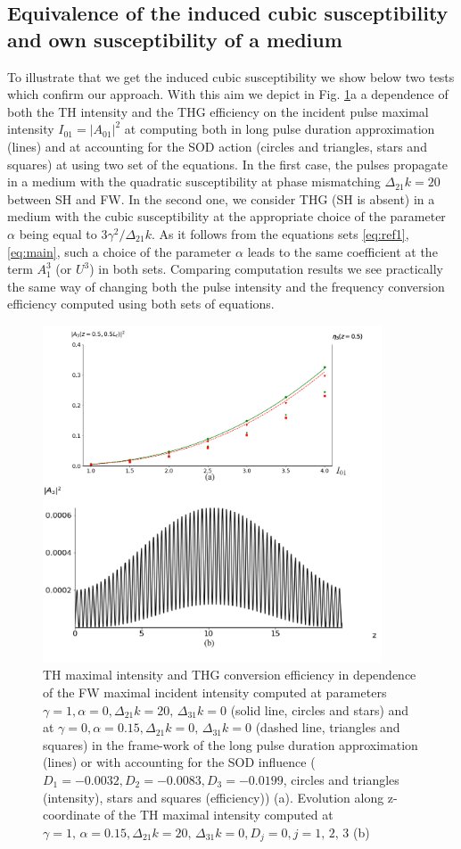 \documentclass[a4paper, 12pt, onecolumn]{extarticle}
\begin{document}
\subsection*{Equivalence   of the induced cubic susceptibility and  own susceptibility of a medium }


To illustrate that we get the induced cubic susceptibility we show below two tests which confirm our approach. With this aim we depict in Fig. \ref{fr:f}a a dependence of both the TH intensity and the THG efficiency on the incident pulse maximal intensity $I_{01}=|A_{01}|^2$  at computing both in long pulse duration approximation (lines) and at accounting for the   SOD action    (circles and triangles, stars and squares) at using two set of the equations. In the first case, the pulses propagate in a medium with the quadratic susceptibility at phase mismatching \(\Delta_{21}k=20\) between SH and FW. In the second one, we consider THG (SH is absent) in a medium with the cubic susceptibility at the appropriate choice of the parameter \(\alpha\) being equal to \(3\gamma^2/\Delta_{21}k\). As it follows from the equations sets \eqref{eq:ref1},\eqref{eq:main}, such a choice of the parameter \(\alpha\) leads to the same coefficient at the term $A_1^3$ (or $U^3$) in both sets. Comparing computation results we see practically the same way of changing both the pulse intensity and the frequency conversion efficiency computed using both sets of equations. 

\begin{figure}[h!] 
\centering 
\includegraphics[height=10cm, width=0.7\linewidth]{CascadeF}  
\caption{  TH maximal intensity and THG conversion efficiency in dependence of the FW maximal incident intensity computed at parameters \(\gamma=1,\alpha=0,\Delta_{21}k=20,\,\Delta_{31}k=0\) (solid line, circles and stars) and at \(\gamma=0,\alpha=0.15,\Delta_{21}k=0,\,\Delta_{31}k=0\) (dashed line, triangles and squares) in the frame-work of the long pulse duration approximation (lines) or with accounting for the   SOD influence (\(D_1=-0.0032, D_2 =  -0.0083, D_3 =  -0.0199\), circles and triangles (intensity), stars and squares (efficiency)) (a).  Evolution along z-coordinate of the TH maximal intensity  computed at $\gamma=1,\,\alpha=0.15,\Delta_{21}k=20,\,\Delta_{31}k=0,D_j=0,j=1,\,2,\,3$ (b)}
\label{fr:f}
\end{figure}
\end{document}

